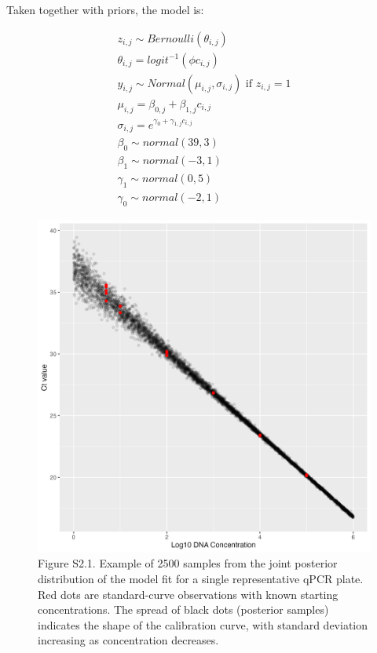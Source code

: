\documentclass[
]{article}
\begin{document}
Taken together with priors, the model is:

\begin{gather*}
z_{i,j} \sim Bernoulli(\theta_{i,j}) \\
\theta_{i,j} = logit^{-1}(\phi c_{i,j}) \\[4mm]
y_{i,j} \sim Normal(\mu_{i,j}, \sigma_{i,j})   \text{    if } z_{i,j} = 1 \\
\mu_{i,j} = \beta_{0,j} + \beta_{1,j} c_{i,j} \\
\sigma_{i,j} = e^{\gamma_{0}  + \gamma_{1,j} c_{i,j}} \\[4mm]
\beta_{0} \sim normal(39, 3) \\
\beta_{1} \sim normal(-3, 1) \\
\gamma_{1} \sim normal(0,5) \\
\gamma_{0} \sim normal(-2,1)
\end{gather*}

\begin{figure}
\centering
\includegraphics{../Output/SupplementalFigures/qPCR_calibration_supplemental.png}
\caption{Figure S2.1. Example of 2500 samples from the joint posterior
distribution of the model fit for a single representative qPCR plate.
Red dots are standard-curve observations with known starting
concentrations. The spread of black dots (posterior samples) indicates
the shape of the calibration curve, with standard deviation increasing
as concentration decreases.\label{fig:qpcrmodel}}
\end{figure}
\end{document}
